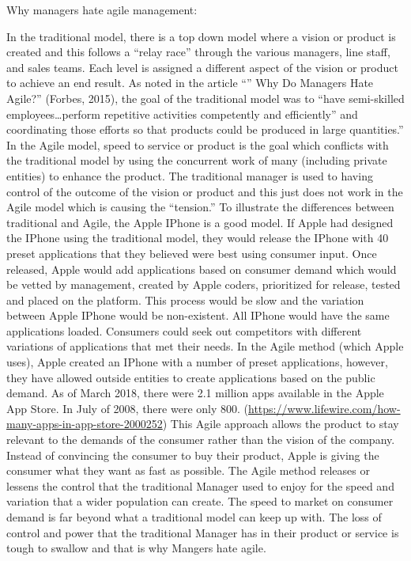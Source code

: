 \documentclass[]{book}
\begin{document}
Why managers hate agile management:

In the traditional model, there is a top down model where a vision or product is created and this follows a ``relay race'' through the various managers, line staff, and sales teams. Each level is assigned a different aspect of the vision or product to achieve an end result. As noted in the article ``'' Why Do Managers Hate Agile?'' (Forbes, 2015), the goal of the traditional model was to ``have semi-skilled employees\ldots{}perform repetitive activities competently and efficiently'' and coordinating those efforts so that products could be produced in large quantities.'' In the Agile model, speed to service or product is the goal which conflicts with the traditional model by using the concurrent work of many (including private entities) to enhance the product. The traditional manager is used to having control of the outcome of the vision or product and this just does not work in the Agile model which is causing the ``tension.''
To illustrate the differences between traditional and Agile, the Apple IPhone is a good model. If Apple had designed the IPhone using the traditional model, they would release the IPhone with 40 preset applications that they believed were best using consumer input. Once released, Apple would add applications based on consumer demand which would be vetted by management, created by Apple coders, prioritized for release, tested and placed on the platform. This process would be slow and the variation between Apple IPhone would be non-existent. All IPhone would have the same applications loaded. Consumers could seek out competitors with different variations of applications that met their needs. In the Agile method (which Apple uses), Apple created an IPhone with a number of preset applications, however, they have allowed outside entities to create applications based on the public demand. As of March 2018, there were 2.1 million apps available in the Apple App Store. In July of 2008, there were only 800. (\url{https://www.lifewire.com/how-many-apps-in-app-store-2000252}) This Agile approach allows the product to stay relevant to the demands of the consumer rather than the vision of the company. Instead of convincing the consumer to buy their product, Apple is giving the consumer what they want as fast as possible.
The Agile method releases or lessens the control that the traditional Manager used to enjoy for the speed and variation that a wider population can create. The speed to market on consumer demand is far beyond what a traditional model can keep up with. The loss of control and power that the traditional Manager has in their product or service is tough to swallow and that is why Mangers hate agile.
\end{document}
